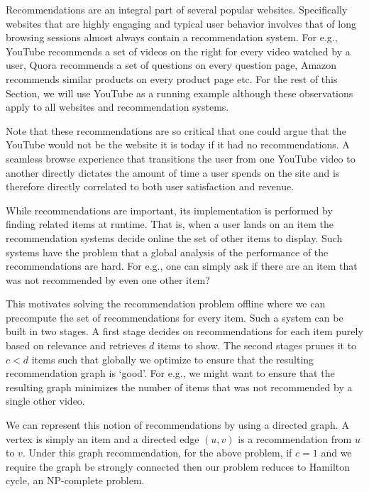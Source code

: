 \iffalse

Recommendations are an integral part of several popular websites. Specifically
websites that are highly engaging and typical user behavior involves that
of long browsing sessions almost always contain a recommendation system. For
e.g., YouTube recommends a set of videos on the right for every video watched
by a user, Quora recommends a set of questions on every question page, Amazon
recommends similar products on every product page etc. For the rest of this
Section, we will use YouTube as a running example although these observations
apply to all websites and recommendation systems. \vs

Note that these recommendations are so critical that one could argue that the
YouTube would not be the website it is today if it had no recommendations. A
seamless browse experience that transitions the user from one YouTube video to
another directly dictates the amount of time a user spends on the site and is
therefore directly correlated to both user satisfaction and revenue. \vs

While recommendations are important, its implementation is performed by finding
related items at runtime. That is, when a user lands on an item the
recommendation systems decide online the set of other items to display. Such
systems have the problem that a global analysis of the performance of the
recommendations are hard. For e.g., one can simply ask if there are an item that
was not recommended by even one other item? \vs

This motivates solving the recommendation problem offline where we can
precompute the set of recommendations for every item. Such a system can be built
in two stages. A first stage decides on recommendations for each item purely
based on relevance and retrieves $d$ items to show. The second stages prunes it
to $c < d$ items such that globally we optimize to ensure that the resulting
recommendation graph is `good'. For e.g., we might want to ensure that the
resulting graph minimizes the number of items that was not recommended by a
single other video. \vs

We can represent this notion of recommendations by using a directed graph. A
vertex is simply an item and a directed edge $(u, v)$ is a recommendation from
$u$ to $v$. Under this graph recommendation, for the above problem, if $c=1$ and
we require the graph be strongly connected then our problem reduces to Hamilton
cycle, an NP-complete problem. \vs


